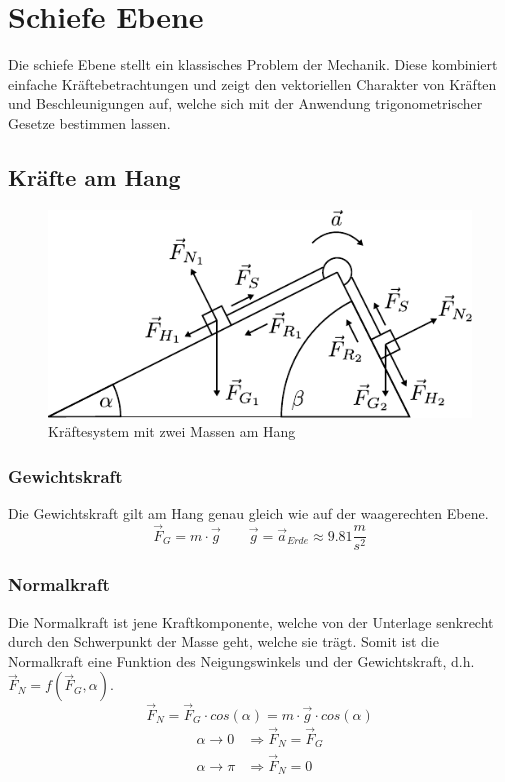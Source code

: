 \chapter{Schiefe Ebene}

Die schiefe Ebene stellt ein klassisches Problem der Mechanik. 
Diese kombiniert einfache Kräftebetrachtungen und zeigt den 
vektoriellen Charakter von Kräften und Beschleunigungen auf, welche sich 
mit der Anwendung trigonometrischer Gesetze bestimmen lassen.

\newpage
\section{Kräfte am Hang}
\begin{figure}[h!]
	\centering
	\includegraphics[scale=1]{schiefe-ebene-1.pdf}
	\caption{Kräftesystem mit zwei Massen am Hang}
	\label{fig:hangsystem}
\end{figure}

\subsection{Gewichtskraft}
Die Gewichtskraft gilt am Hang genau gleich wie auf der waagerechten Ebene.
\[ \boxed{\vec{F}_G = m \cdot \vec{g}} 
	\qquad \vec{g} = \vec{a}_{Erde} \approx 9.81\frac{m}{s^2} \]

\subsection{Normalkraft}
Die Normalkraft ist jene Kraftkomponente, welche von der Unterlage senkrecht
durch den Schwerpunkt der Masse geht, welche sie trägt. Somit ist die 
Normalkraft eine Funktion des Neigungswinkels und der Gewichtskraft, d.h.
$\vec{F}_N = f(\vec{F}_G, \alpha)$.
\[ \boxed{ \vec{F}_N 
	= \vec{F}_G \cdot cos(\alpha) 
	= m \cdot \vec{g} \cdot cos(\alpha)} 
\]
\[ \begin{array}{ll}
	\alpha \rightarrow 0 & \Rightarrow \vec{F}_N = \vec{F}_G \\
	\alpha \rightarrow \pi & \Rightarrow \vec{F}_N = 0
\end{array} \]

